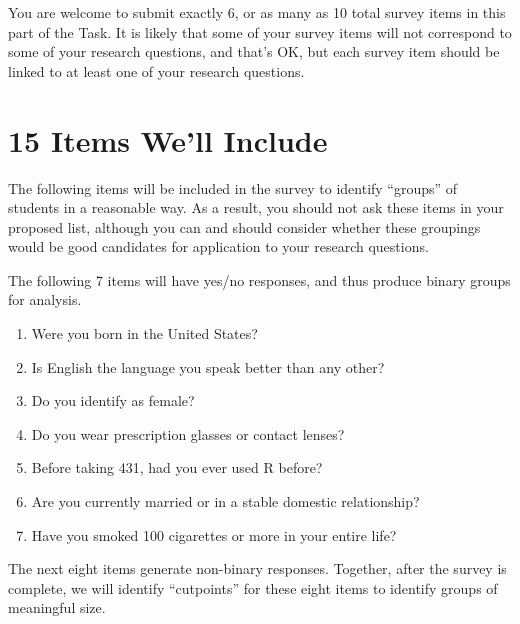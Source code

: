 \documentclass[]{book}
\providecommand{\tightlist}{%
  \setlength{\itemsep}{0pt}\setlength{\parskip}{0pt}}
\begin{document}
You are welcome to submit exactly 6, or as many as 10 total survey items in this part of the Task. It is likely that some of your survey items will not correspond to some of your research questions, and that's OK, but each survey item should be linked to at least one of your research questions.

\hypertarget{items-well-include}{%
\section{15 Items We'll Include}\label{items-well-include}}

The following items will be included in the survey to identify ``groups'' of students in a reasonable way. As a result, you should not ask these items in your proposed list, although you can and should consider whether these groupings would be good candidates for application to your research questions.

The following 7 items will have yes/no responses, and thus produce binary groups for analysis.

\begin{enumerate}
\def\labelenumi{\arabic{enumi}.}
\tightlist
\item
  Were you born in the United States?
\item
  Is English the language you speak better than any other?
\item
  Do you identify as female?
\item
  Do you wear prescription glasses or contact lenses?
\item
  Before taking 431, had you ever used R before?
\item
  Are you currently married or in a stable domestic relationship?
\item
  Have you smoked 100 cigarettes or more in your entire life?
\end{enumerate}

The next eight items generate non-binary responses. Together, after the survey is complete, we will identify ``cutpoints'' for these eight items to identify groups of meaningful size.
\end{document}
